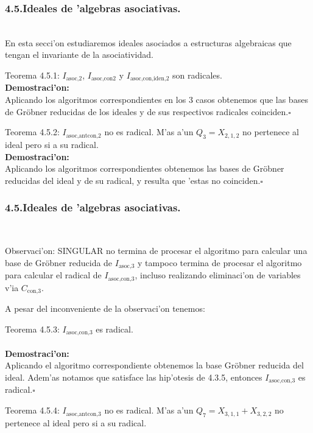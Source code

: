\documentclass[10pt]{beamer}
\begin{document}
\begin{frame}
\frametitle{4.5.Ideales de 'algebras asociativas.}\\
En esta secci'on estudiaremos ideales asociados a estructuras algebraicas que tengan el invariante de la asociatividad.\\
\begin{block}{Teorema 4.5.1:}
$I_{\text{asoc,}2}$, $I_{\text{asoc,con}2}$ y $I_{\text{asoc,con,iden,}2}$ son radicales.\\
\textbf{Demostraci'on:}\\
Aplicando los algoritmos correspondientes en los $3$ casos obtenemos que las bases de Gr\"obner reducidas de los ideales y de sus respectivos radicales coinciden.\hfill $\square$\\
\end{block}
\begin{block}{Teorema 4.5.2:}
$I_{\text{asoc,antcon,}2}$ no es radical. M'as a'un $Q_{3}=X_{2,1,2}$ no pertenece al ideal pero si a su radical.\\
\textbf{Demostraci'on:}\\
Aplicando los algoritmos correspondientes obtenemos las bases de Gr\"obner reducidas del ideal y de su radical, y resulta que 'estas no coinciden.\hfill $\square$
\end{block}
\end{frame}

\begin{frame}
\frametitle{4.5.Ideales de 'algebras asociativas.}\\
\begin{block}{Observaci'on:}
SINGULAR no termina de procesar el algoritmo para calcular una base de Gr\"obner reducida de $I_{\text{asoc,}3}$ y tampoco termina de procesar el algoritmo para calcular el radical de $I_{\text{asoc,con,}3}$, incluso realizando eliminaci'on de variables v'ia $C_{\text{con,}3}$.\\ 
\end{block}

A pesar del inconveniente de la observaci'on tenemos:\\

\begin{block}{Teorema 4.5.3:}
$I_{\text{asoc,con,}3}$ es radical.\\
\\
\textbf{Demostraci'on:}\\
Aplicando el algoritmo correspondiente obtenemos la base Gr\"obner reducida del ideal. Adem'as notamos que satisface las hip'otesis de 4.3.5, entonces $I_{\text{asoc,con,}3}$ es radical.\hfill $\square$\\
\end{block}
\begin{block}{Teorema 4.5.4:}
$I_{\text{asoc,antcon,}3}$ no es radical. M'as a'un $Q_{7}=X_{3,1,1}+X_{3,2,2}$ no pertenece al ideal pero si a su radical.\\
\end{block}
\end{frame}
\end{document}
